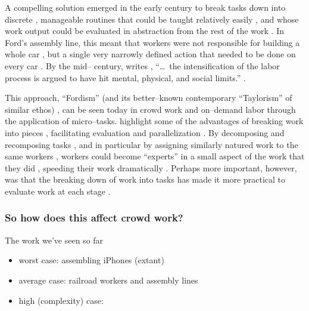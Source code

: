 \documentclass[trackingWork]{subfiles}
\begin{document}
{A compelling solution emerged in the early  century to break tasks down into discrete%
, manageable routines that could be taught relatively easily%
, and whose work output could be evaluated in abstraction from the rest of the work
\cite{restructuringPieceworkBaker}.
In Ford's assembly line, this meant that workers were not responsible for building a whole car%
, but a single very narrowly defined action that needed to be done on every car
\cite{towardsGlobalFordism}.
By the mid-- century, \citeauthor{schoenberger1988fordism} writes%
, ``\dots~the intensification of the labor process is argued to have hit mental, physical, and social limits.''
\cite{schoenberger1988fordism}.

This approach, ``Fordism'' (and its better--known contemporary ``Taylorism'' of similar ethos)%
, can be seen today in crowd work and on--demand labor through the application of micro--tasks.
\citeauthor{writingMicroTasks} highlight some of the advantages of breaking work into pieces%
, facilitating evaluation and parallelization
\cite{writingMicroTasks}.
By decomposing and recomposing tasks%
, and in particular by assigning similarly natured work to the same workers%
, workers could become ``experts'' in a small aspect of the work that they did%
, speeding their work dramatically
\cite{delayAndOrderLasecki}.
Perhaps more important, however, was that
the breaking down of work into tasks has made it more practical to evaluate work at each stage
\cite{rogstadius2011assessment}.

\subsubsection{So how does this affect crowd work?}
The work we've seen so far 
\begin{itemize}
  \item worst case: assembling iPhones (extant)
  \item average case: railroad workers and assembly lines
  \item high (complexity) case: 
\end{itemize}



}
\end{document}
